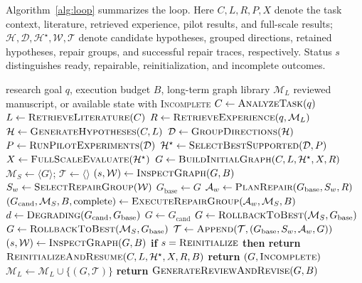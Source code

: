 \documentclass[letterpaper]{article} %
\begin{document}
Algorithm~\ref{alg:loop} summarizes the loop. Here $C,L,R,P,X$ denote the task context, literature, retrieved experience, pilot results, and full-scale results; $\mathcal{H},\mathcal{D},\mathcal{H}^{\star},\mathcal{W},\mathcal{T}$ denote candidate hypotheses, grouped directions, retained hypotheses, repair groups, and successful repair traces, respectively. Status $s$ distinguishes ready, repairable, reinitialization, and incomplete outcomes.
\begin{algorithm}[t] 
\caption{EviGraph research loop} 
\label{alg:loop}
\scriptsize
\begin{algorithmic}
\REQUIRE research goal $q$, execution budget $B$, long-term graph library $\mathcal{M}_{L}$
\ENSURE reviewed manuscript, or available state with \textsc{Incomplete}
\STATE {}
\STATE $C \leftarrow \textsc{AnalyzeTask}(q)$
\STATE $L \leftarrow \textsc{RetrieveLiterature}(C)$
\STATE $R \leftarrow \textsc{RetrieveExperience}(q,\mathcal{M}_{L})$
\STATE $\mathcal{H} \leftarrow \textsc{GenerateHypotheses}(C,L)$
\STATE $\mathcal{D}\leftarrow\textsc{GroupDirections}(\mathcal{H})$
\STATE $P \leftarrow\textsc{RunPilotExperiments}(\mathcal{D})$
\STATE $\mathcal{H}^{\star}\leftarrow\textsc{SelectBestSupported}(\mathcal{D},P)$
\STATE $X \leftarrow \textsc{FullScaleEvaluate}(\mathcal{H}^{\star})$
\STATE $G \leftarrow \textsc{BuildInitialGraph}(C,L,\mathcal{H}^{\star},X,R)$
\STATE {}
\STATE $\mathcal{M}_{S}\leftarrow\langle G\rangle$; $\mathcal{T}\leftarrow\langle\rangle$
\STATE $(s,\mathcal{W})\leftarrow\textsc{InspectGraph}(G,B)$
\STATE $S_w\leftarrow\textsc{SelectRepairGroup}(\mathcal{W})$
\STATE $G_{\mathrm{base}}\leftarrow G$
\STATE $\mathcal{A}_w\leftarrow\textsc{PlanRepair}(G_{\mathrm{base}},S_w,R)$
\STATE $(G_{\mathrm{cand}},\mathcal{M}_{S},B,\mathrm{complete})\leftarrow\textsc{ExecuteRepairGroup}(\mathcal{A}_w,\mathcal{M}_{S},B)$
\STATE $d\leftarrow\textsc{Degrading}(G_{\mathrm{cand}},G_{\mathrm{base}})$
\STATE $G\leftarrow G_{\mathrm{cand}}$
\ELSE
\STATE $G\leftarrow\textsc{RollbackToBest}(\mathcal{M}_{S},G_{\mathrm{base}})$
\ENDIF
\ELSE
\STATE $G\leftarrow\textsc{RollbackToBest}(\mathcal{M}_{S},G_{\mathrm{base}})$
\ENDIF
{}
\STATE $\mathcal{T}\leftarrow\textsc{Append}(\mathcal{T},(G_{\mathrm{base}},S_w,\mathcal{A}_w,G))$
\ENDIF
\STATE $(s,\mathcal{W})\leftarrow\textsc{InspectGraph}(G,B)$
\ENDWHILE
\STATE {}
\STATE \textbf{if} $s=\textsc{Reinitialize}$ \textbf{ then return} $\textsc{ReinitializeAndResume}(C,L,\mathcal{H}^{\star},X,R,B)$
\STATE \textbf{return} $(G,\textsc{Incomplete})$
\ENDIF
\STATE $\mathcal{M}_{L}\leftarrow\mathcal{M}_{L}\cup\{(G,\mathcal{T})\}$
\STATE \textbf{return} $\textsc{GenerateReviewAndRevise}(G,B)$
\end{algorithmic} 
\end{algorithm} 
\end{document}
